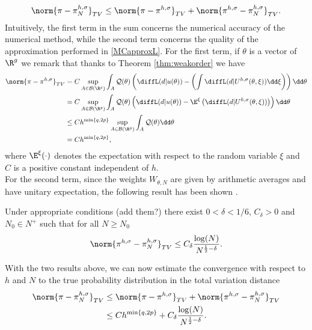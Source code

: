 \begin{equation}
	\norm{\pi- \pi_N^{h, \sigma}}_{TV} \leq \norm{\pi - \pi^{h, \sigma}}_{TV} + \norm{\pi^{h,\sigma} - \pi_N^{h, \sigma}}_{TV}.
\end{equation}
\noindent Intuitively, the first term in the sum concerns the numerical accuracy of the numerical method, while the second term concerns the quality of the approximation performed in \eqref{MCapproxL}. For the first term, if $\theta$ is a vector of $\R^g$ we remark that thanks to Theorem \ref{thm:weakorder} we have
\begin{equation}
\begin{aligned}
	\norm{\pi-\pi^{h,\sigma}}_{TV} &= C \sup_{A\in\mathcal{B}(\R^g)} \int_{A} \mathcal{Q}(\theta)\left(\diffL(d|u(\theta)) - \left(\int \diffL(d|U^{h,\sigma}(\theta,\xi))\dd\xi\right) \right) \dd \theta\\
							  &= C \sup_{A\in\mathcal{B}(\R^g)} \int_{A} \mathcal{Q}(\theta)\left(\diffL(d|u(\theta)) - \E^\xi\left(\diffL(d|U^{h,\sigma}(\theta,\xi))\right) \right) \dd \theta\\
							  &\leq C h^{\min\left\{q,2p\right\}}\sup_{A\in\mathcal{B}(\R^g)}\int_{A} \mathcal{Q}(\theta) \dd\theta \\
						      &= C h^{\min\left\{q,2p\right\}},
\end{aligned}
\end{equation}
where $\E^\xi(\cdot)$ denotes the expectation with respect to the random variable $\xi$ and $C$ is a positive constant independent of $h$. \\
For the second term, since the weights $W_{\theta,N}$ are given by arithmetic averages and have unitary expectation, the following result has been shown \cite{MLR16}.
\begin{theorem} Under appropriate conditions (add them?) there exist $0 < \delta < 1/6$, $C_{\delta} > 0$ and $N_0 \in N^{+}$ such that for all $N \geq N_0$ 
\begin{equation}
	\norm{\pi^{h,\sigma} - \pi^{h,\sigma}_N}_{TV} \leq C_{\delta} \frac{\log(N)}{N^{\frac{1}{2} - \delta}}.
\end{equation}
\end{theorem}
\noindent With the two results above, we can now estimate the convergence with respect to $h$ and $N$ to the true probability distribution in the total variation distance
\begin{equation}
\begin{aligned}
	\norm{\pi- \pi_N^{h, \sigma}}_{TV} &\leq \norm{\pi - \pi^{h, \sigma}}_{TV} + \norm{\pi^{h,\sigma} - \pi_N^{h, \sigma}}_{TV}\\
									   &\leq C h^{\min\left\{q,2p\right\}} + C_{\delta} \frac{\log(N)}{N^{\frac{1}{2} - \delta}}.
\end{aligned}
\end{equation}
